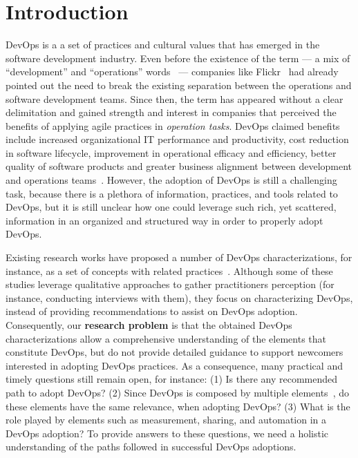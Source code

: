 \section{Introduction} \label{sec:introduction}

DevOps is a a set of practices and cultural values that has emerged in the
software development industry. Even before
the existence of the term --- a mix of ``development'' and ``operations''
words~\cite{httermann2012devops} --- companies like Flickr~\cite{flickr}
had already pointed out the need to break the existing separation between
the operations and software development teams. Since then, the term
has appeared without a clear delimitation and gained strength and interest
in companies that perceived the benefits of applying agile practices in
\emph{operation tasks}.
DevOps claimed benefits include increased organizational IT
performance and productivity, cost reduction in software lifecycle, improvement
in operational efficacy and efficiency, better quality of software products and
greater business alignment between development and operations
teams~\cite{characterizing_devops_sbes_2016,state_of_devops,DevOps_Adoption_Benefits_and_Challenges}.
However, the adoption of DevOps is still a challenging task, because there is a
plethora of information, practices, and tools related to DevOps, but it is still unclear
how one could leverage such rich, yet scattered, information in an organized and
structured way in order to properly adopt DevOps.

Existing research works have proposed a
number of DevOps characterizations, for instance, as a set of concepts with
related
practices~\cite{cooperation_dev_ops_esem_2014,devops_a_definition_xp_15,dimensions_of_devops_xp_15,extending_dimensions_icsea_16,characterizing_devops_sbes_2016,qualitative_devops_journalsw_17}. Although some
of these studies leverage qualitative approaches to gather practitioners\textsc{} perception (for instance,
conducting interviews with them), they focus on characterizing DevOps,
instead of providing recommendations to assist on DevOps adoption. Consequently,
our {\bf research problem} is that the obtained DevOps characterizations allow a
comprehensive understanding of the elements that constitute DevOps, but do not
provide detailed guidance to support newcomers interested in adopting DevOps practices.
As a consequence, many practical and timely questions still remain open, for
instance: (1) Is there any recommended path to adopt DevOps? (2) Since
DevOps is composed by multiple elements~\cite{dimensions_of_devops_xp_15}, do
these elements have the same relevance, when adopting DevOps?
(3) What is the role played by elements such as measurement, sharing, and automation
in a DevOps adoption? To provide answers to these questions, we need a holistic
understanding of the paths followed in successful DevOps adoptions.

